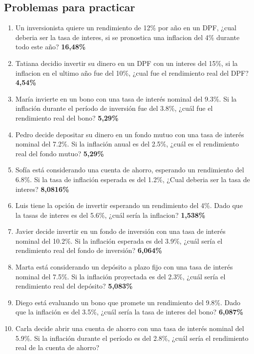 \subsection{Problemas para practicar}
\begin{enumerate}
    \item Un inversionista quiere un rendimiento de 12\% por año en un DPF, ¿cual deberia ser la tasa de interes, si se pronostica una inflacion del 4\% durante todo este año?
    \textbf{16,48\%}
    \item Tatiana decidio invertir su dinero en un DPF con un interes del 15\%, si la inflacion en el ultimo año fue del 10\%, ¿cual fue el rendimiento real del DPF?
    \textbf{4,54\%}
    \item María invierte en un bono con una tasa de interés nominal del 9.3\%. Si la inflación durante el período de inversión fue del 3.8\%, ¿cuál fue el rendimiento real del bono?
    \textbf{5,29\%}
    \item Pedro decide depositar su dinero en un fondo mutuo con una tasa de interés nominal del 7.2\%. Si la inflación anual es del 2.5\%, ¿cuál es el rendimiento real del fondo mutuo?    
    \textbf{5,29\%}
    \item Sofía está considerando una cuenta de ahorro, esperando un rendimiento del 6.8\%. Si la tasa de inflación esperada es del 1.2\%, ¿Cual deberia ser la tasa de interes?
    \textbf{8,0816\%}
    \item Luis tiene la opción de invertir esperando un rendimiento del 4\%. Dado que la tasas de interes es del 5.6\%, ¿cuál sería la inflacion?
    \textbf{1,538\%}
    \item Javier decide invertir en un fondo de inversión con una tasa de interés nominal del 10.2\%. Si la inflación esperada es del 3.9\%, ¿cuál sería el rendimiento real del fondo de inversión?
    \textbf{6,064\%}
    \item Marta está considerando un depósito a plazo fijo con una tasa de interés nominal del 7.5\%. Si la inflación proyectada es del 2.3\%, ¿cuál sería el rendimiento real del depósito?
    \textbf{5,083\%}
    \item Diego está evaluando un bono que promete un rendimiento del 9.8\%. Dado que la inflación es del 3.5\%, ¿cuál sería la tasa de interes del bono?
    \textbf{6,087\%}
    \item Carla decide abrir una cuenta de ahorro con una tasa de interés nominal del 5.9\%. Si la inflación durante el período es del 2.8\%, ¿cuál sería el rendimiento real de la cuenta de ahorro?

\end{enumerate}
